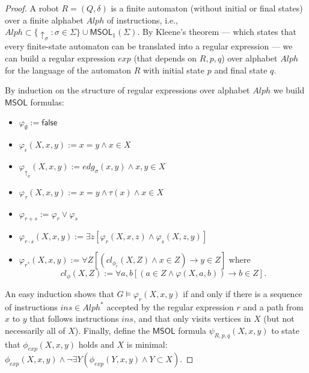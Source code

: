 \documentclass{aamas2015}
\def\false{\textsf{false}}
\newcommand{\tpl}[1]{\left<{#1}\right>}
\def\ins{\textsc{ins}}
\def\msol{\mathsf{MSOL}}
\begin{document}
\begin{proof}
A robot $R = (Q,\delta)$ is a finite automaton (without initial or final states) over a finite alphabet $Alph$ of instructions, i.e., $Alph \subset \{\uparrow_\sigma : \sigma \in \Sigma\} \cup \msol_1(\Sigma)$. By Kleene's theorem --- which states that every finite-state automaton can be translated into a regular expression --- we can build a regular expression $exp$ (that depends on $R,p,q$) over alphabet $Alph$ for the language of the automaton $R$ with initial state $p$ and final state $q$.

By induction on the structure of regular expressions over alphabet $Alph$ we build $\msol$ formulas:
\begin{itemize}
\item $\varphi_{\emptyset} := \false$
\item $\varphi_{\epsilon}(X,x,y) := x = y \wedge x \in X$
\item $\varphi_{\uparrow_\sigma} (X,x,y) := edg_\sigma(x,y) \wedge x,y \in X$
\item $\varphi_{\tau}(X,x,y) := x = y \wedge \tau(x) \wedge x \in X$
\item $\varphi_{r + s} := \varphi_{r} \vee \varphi_{s}$
\item $\varphi_{r \cdot s}(X,x,y) := \exists z \left[\varphi_{r}(X,x,z) \wedge \varphi_{s}(X,z,y)\right]$
\item $\varphi_{r^*}(X,x,y) := \forall Z [(cl_{\phi_r}(X,Z) \wedge x \in Z) \to y \in Z]$ where 
\[
cl_{\phi}(X,Z) := \forall a,b \left[(a \in Z \wedge \varphi(X,a,b)) \to b \in Z\right].
\]
\end{itemize}

An easy induction shows that $G \models \varphi_r(X,x,y)$ if and only if there is a sequence of instructions $ins \in Alph^*$ accepted by the regular expression $r$ and a path from $x$ to $y$ that follows instructions $ins$, and that only visits vertices in $X$ (but not necessarily all of $X$). Finally, define the $\msol$ formula $\psi_{R,p,q}(X,x,y)$ to state that $\phi_{exp}(X,x,y)$ holds and $X$ is minimal:
$
\phi_{exp}(X,x,y) \wedge \neg \exists Y (\phi_{exp}(Y,x,y) \wedge Y  \subset X).
$



\end{proof}
\end{document}
